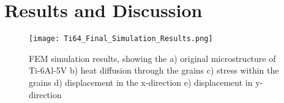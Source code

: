 \documentclass[report.tex]{subfiles}
\begin{document}
\section{Results and Discussion}

\begin{figure}[h!]
    \centering
    \texttt{[image: Ti64\_Final\_Simulation\_Results.png]}
    \caption{FEM simulation results, showing the a) original microstructure of Ti-6Al-5V b) heat diffusion through the grains c) stress    within the grains d) displacement in the x-direction e) displacement in y-direction}
    \label{fig:FinalSimulationResults}
\end{figure}
\end{document}
